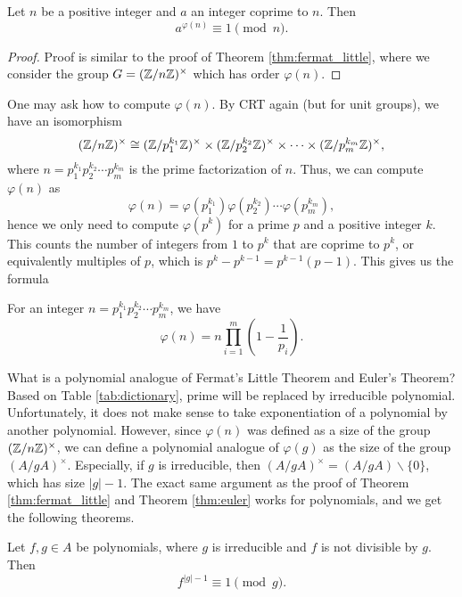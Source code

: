 \begin{theorem}
    \label{thm:euler}
    Let $n$ be a positive integer and $a$ an integer coprime to $n$.
    Then
    \[
        a^{\varphi(n)} \equiv 1 \pmod{n}.
    \]
\end{theorem}
\begin{proof}
    Proof is similar to the proof of Theorem \ref{thm:fermat_little}, where we consider the group $G = (\mathbb{Z} / n\mathbb{Z})^\times$ which has order $\varphi(n)$.
\end{proof}

One may ask how to compute $\varphi(n)$.
By CRT again (but for unit groups), we have an isomorphism
\[
    (\mathbb{Z} / n\mathbb{Z})^\times \cong (\mathbb{Z} / p_1^{k_1}\mathbb{Z})^\times \times (\mathbb{Z} / p_2^{k_2}\mathbb{Z})^\times \times \cdots \times (\mathbb{Z} / p_m^{k_m}\mathbb{Z})^\times,
\]
where $n = p_1^{k_1} p_2^{k_2} \cdots p_m^{k_m}$ is the prime factorization of $n$.
Thus, we can compute $\varphi(n)$ as
\[
    \varphi(n) = \varphi(p_1^{k_1}) \varphi(p_2^{k_2}) \cdots \varphi(p_m^{k_m}),
\]
hence we only need to compute $\varphi(p^k)$ for a prime $p$ and a positive integer $k$.
This counts the number of integers from $1$ to $p^k$ that are coprime to $p^k$, or equivalently multiples of $p$, which is $p^k - p^{k - 1} = p^{k - 1}(p - 1)$.
This gives us the formula
\begin{theorem}
    \label{thm:phi_prime_power}
    For an integer $n = p_1^{k_1} p_2^{k_2} \cdots p_m^{k_m}$, we have
    \begin{equation}
    \label{eqn:phi_formula}
    \varphi(n) = n \prod_{i=1}^m \left(1 - \frac{1}{p_i}\right).
    \end{equation}
\end{theorem}

What is a polynomial analogue of Fermat's Little Theorem and Euler's Theorem?
Based on Table \ref{tab:dictionary}, prime will be replaced by irreducible polynomial.
Unfortunately, it does not make sense to take exponentiation of a polynomial by another polynomial.
However, since $\varphi(n)$ was defined as a size of the group $(\mathbb{Z} / n\mathbb{Z})^\times$, we can define a polynomial analogue of $\varphi(g)$ as the size of the group $(A / gA)^\times$.
Especially, if $g$ is irreducible, then $(A / gA)^\times = (A / gA) \backslash \{0\}$, which has size $|g| - 1$.
The exact same argument as the proof of Theorem \ref{thm:fermat_little} and Theorem \ref{thm:euler} works for polynomials, and we get the following theorems.


\begin{theorem}
    \label{thm:polynomial_fermat_little}
    Let $f, g \in A$ be polynomials, where $g$ is irreducible and $f$ is not divisible by $g$.
    Then
    \[
        f^{|g| - 1} \equiv 1 \pmod{g}.
    \]
\end{theorem}



